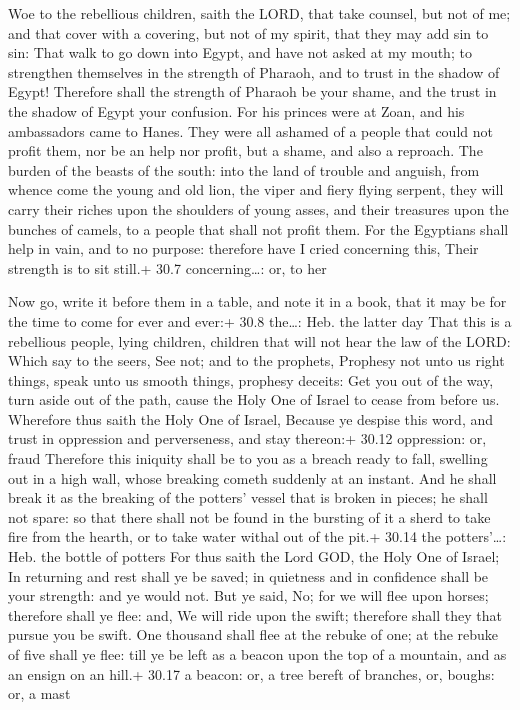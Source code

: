  Woe to the rebellious children, saith the LORD, that take
counsel, but not of me; and that cover with a covering, but not of my
spirit, that they may add sin to sin:  That walk to go down
into Egypt, and have not asked at my mouth; to strengthen themselves in
the strength of Pharaoh, and to trust in the shadow of Egypt!
 Therefore shall the strength of Pharaoh be your shame, and
the trust in the shadow of Egypt your confusion.  For his
princes were at Zoan, and his ambassadors came to Hanes. 
They were all ashamed of a people that could not profit them, nor be an
help nor profit, but a shame, and also a reproach.  The
burden of the beasts of the south: into the land of trouble and anguish,
from whence come the young and old lion, the viper and fiery flying
serpent, they will carry their riches upon the shoulders of young asses,
and their treasures upon the bunches of camels, to a people that shall
not profit them.  For the Egyptians shall help in vain, and
to no purpose: therefore have I cried concerning this, Their strength is
to sit still.+ 30.7 concerning\ldots: or, to her

 Now go, write it before them in a table, and note it in a
book, that it may be for the time to come for ever and ever:+ 30.8
the\ldots: Heb. the latter day  That this is a rebellious
people, lying children, children that will not hear the law of the LORD:
 Which say to the seers, See not; and to the prophets,
Prophesy not unto us right things, speak unto us smooth things, prophesy
deceits:  Get you out of the way, turn aside out of the
path, cause the Holy One of Israel to cease from before us.
 Wherefore thus saith the Holy One of Israel, Because ye
despise this word, and trust in oppression and perverseness, and stay
thereon:+ 30.12 oppression: or, fraud  Therefore this
iniquity shall be to you as a breach ready to fall, swelling out in a
high wall, whose breaking cometh suddenly at an instant. 
And he shall break it as the breaking of the potters' vessel that is
broken in pieces; he shall not spare: so that there shall not be found
in the bursting of it a sherd to take fire from the hearth, or to take
water withal out of the pit.+ 30.14 the potters'\ldots: Heb. the bottle
of potters  For thus saith the Lord GOD, the Holy One of
Israel; In returning and rest shall ye be saved; in quietness and in
confidence shall be your strength: and ye would not.  But
ye said, No; for we will flee upon horses; therefore shall ye flee: and,
We will ride upon the swift; therefore shall they that pursue you be
swift.  One thousand shall flee at the rebuke of one; at
the rebuke of five shall ye flee: till ye be left as a beacon upon the
top of a mountain, and as an ensign on an hill.+ 30.17 a beacon: or, a
tree bereft of branches, or, boughs: or, a mast

